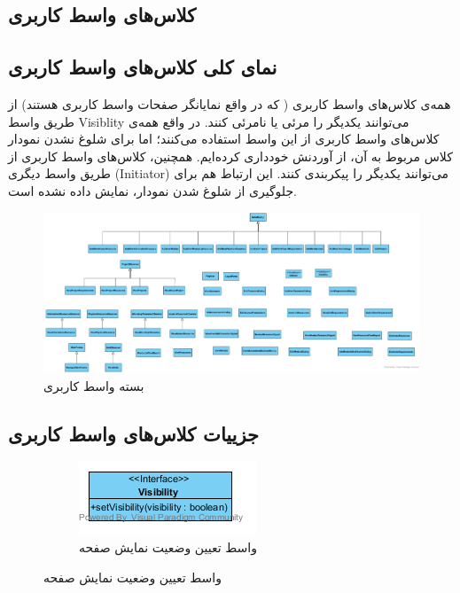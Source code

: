 \begin{landscape}
\section{کلاس‌های واسط کاربری}
\subsection{نمای کلی کلاس‌های واسط کاربری}
همه‌ی کلاس‌های واسط کاربری ( که در واقع نمایانگر صفحات واسط کاربری هستند) از طریق واسط Visiblity می‌توانند یکدیگر را مرئی یا نامرئی کنند. در واقع همه‌ی کلاس‌های واسط کاربری از این واسط استفاده می‌کنند؛ اما برای شلوغ نشدن نمودار کلاس مربوط به آن، از آوردنش خودداری کرده‌ایم. همچنین، کلاس‌های واسط کاربری از طریق واسط دیگری (Initiator) می‌توانند یکدیگر را پیکربندی کنند. این ارتباط هم برای جلوگیری از شلوغ شدن نمودار، نمایش داده نشده است.\\
\begin{figure}[H]
	\centering
	\includegraphics[scale=0.4]{img/class-design/ui/UI}
	\caption{بسته واسط کاربری}
\end{figure}
\end{landscape}

\subsection{جزییات کلاس‌های واسط کاربری}
\begin{figure}[H]
	\centering
	\begin{subfigure}[b]{0.4\textwidth}
		\includegraphics[width=\textwidth]{img/class-design/ui/Visibility.png}
		\caption{واسط تعیین وضعیت نمایش صفحه}
	\end{subfigure}
\end{figure}


